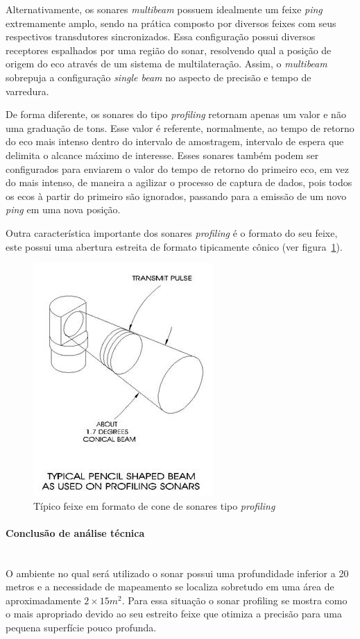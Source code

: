 Alternativamente, os sonares \emph{multibeam} possuem idealmente um feixe \emph{ping} extremamente amplo, sendo na prática composto por diversos feixes com seus respectivos transdutores sincronizados. Essa configuração possui diversos receptores espalhados por uma região do sonar, resolvendo qual a posição de origem do eco através de um sistema de multilateração. Assim, o \emph{multibeam} sobrepuja a configuração \emph{single beam} no aspecto de precisão e tempo de varredura.

De forma diferente, os sonares do tipo \emph{profiling} retornam apenas um valor e não uma graduação de tons. Esse valor é referente, normalmente, ao tempo de retorno do eco mais intenso dentro do intervalo de amostragem, intervalo de espera que delimita o alcance máximo de interesse. Esses sonares também podem ser configurados para enviarem o valor do tempo de retorno do primeiro eco, em vez do mais intenso, de maneira a agilizar o processo de captura de dados, pois todos os ecos à partir do primeiro são ignorados, passando para a emissão de um novo \emph{ping} em uma nova posição.

Outra característica importante dos sonares \emph{profiling} é o formato do seu feixe, este possui uma abertura estreita de formato tipicamente cônico (ver figura~\ref{sonar_3}).

\begin{figure}[H]
    \centering
    \includegraphics[width=0.5\columnwidth]{figs/sonar/3.jpg}
    \caption{Típico feixe em formato de cone de sonares tipo \emph{profiling}}
    \label{sonar_3}
\end{figure}



 \paragraph{Conclusão de análise técnica}\mbox{}\\
 O ambiente no qual será utilizado o sonar possui uma profundidade inferior a 20
 metros e a necessidade de mapeamento se localiza sobretudo em uma área de
 aproximadamente $2 \times 15 m^2$. Para essa situação o sonar profiling se
 mostra como o mais apropriado devido ao seu estreito feixe que otimiza a
 precisão para uma pequena superfície pouco profunda.
